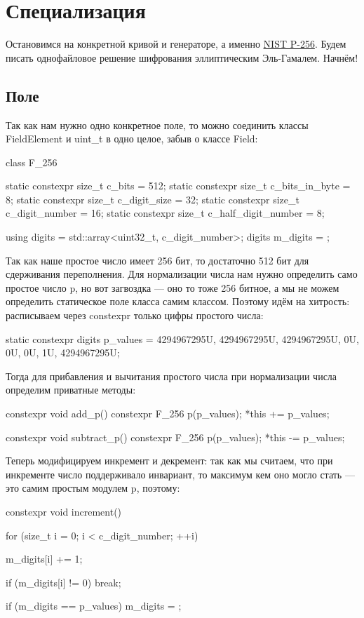 
\section{Специализация}
Остановимся на конкретной кривой и генераторе, а именно \href{https://neuromancer.sk/std/nist/P-256}{NIST P-256}. Будем писать однофайловое решение шифрования эллиптическим Эль-Гамалем. Начнём!

\subsection{Поле}
Так как нам нужно одно конкретное поле, то можно соединить классы FieldElement и uint\_t в одно целое, забыв о классе Field:
\begin{cppcode}
class F_256 {
    static constexpr size_t c_bits = 512;
    static constexpr size_t c_bits_in_byte = 8;
    static constexpr size_t c_digit_size = 32;
    static constexpr size_t c_digit_number = 16;
    static constexpr size_t c_half_digit_number = 8;

    using digits = std::array<uint32_t, c_digit_number>;
    digits m_digits = {};
}
\end{cppcode}
Так как наше простое число имеет 256 бит, то достаточно 512 бит для сдерживания переполнения. Для нормализации числа нам нужно определить само простое число p, но вот загвоздка --- оно то тоже 256 битное, а мы не можем определить статическое поле класса самим классом. Поэтому идём на хитрость: расписываем через constexpr только цифры простого числа:
\begin{cppcode}
static constexpr digits p_values = {4294967295U, 4294967295U, 4294967295U, 0U, 0U, 0U, 1U, 4294967295U};
\end{cppcode}
Тогда для прибавления и вычитания простого числа при нормализации числа определим приватные методы:
\begin{cppcode}
constexpr void add_p() {
    constexpr F_256 p(p_values);
    *this += p_values;
}

constexpr void subtract_p() {
    constexpr F_256 p(p_values);
    *this -= p_values;
}
\end{cppcode}
Теперь модифицируем инкремент и декремент: так как мы считаем, что при инкременте число поддерживало инвариант, то максимум кем оно могло стать --- это самим простым модулем p, поэтому:
\begin{cppcode}
constexpr void increment() {
    for (size_t i = 0; i < c_digit_number; ++i) {
        m_digits[i] += 1;

        if (m_digits[i] != 0) {
            break;
        }
    }

    if (m_digits == p_values) {
        m_digits = {};
    }
}
\end{cppcode}
